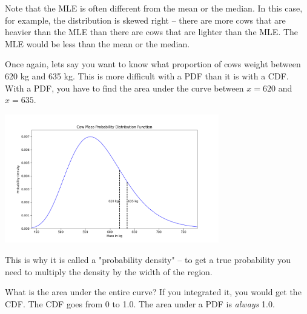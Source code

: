 Note that the MLE is often different from the mean or the median.  In this case, for example,  the distribution is skewed right -- there are more cows that are heavier than the 
MLE than there are cows that are lighter than the MLE.    The MLE would be less than the mean or the median.

Once again,  lets say you want to know what proportion of cows weight between 620 kg and 635 kg.   This is more difficult with a PDF than it is with a CDF.  With a PDF,  you have to find
the area under the curve between $x=620$ and $x=635$.  

\includegraphics[width=0.7\textwidth]{cow_pdf_bounds.png}

This is why it is called a "probability density" -- to get a true probability you need to multiply the density by the width of the region.

What is the area under the entire curve?  If you integrated it, you would get the CDF.  The CDF goes from 0 to 1.0.   The area under a PDF is \emph{always} 1.0.
